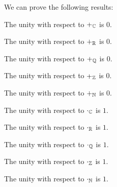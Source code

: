 \documentclass{article}
\begin{document}
We can prove the following results:
\begin{thm}
\item The unity with respect to $+_{\mathbb{C}}$ is $0$.
\item The unity with respect to $+_{\mathbb{R}}$ is $0$.
\item The unity with respect to $+_{\mathbb{Q}}$ is $0$.
\item The unity with respect to $+_{\mathbb{Z}}$ is $0$.
\item The unity with respect to $+_{\mathbb{N}}$ is $0$.
\item The unity with respect to $\cdot_{\mathbb{C}}$ is $1$.
\item The unity with respect to $\cdot_{\mathbb{R}}$ is $1$.
\item The unity with respect to $\cdot_{\mathbb{Q}}$ is $1$.
\item The unity with respect to $\cdot_{\mathbb{Z}}$ is $1$.
\item The unity with respect to $\cdot_{\mathbb{N}}$ is $1$.
\end{thm}
\end{document}
